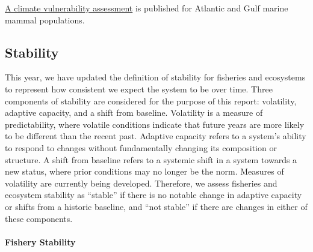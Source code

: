 \documentclass[
  10pt,
]{article}
\begin{document}
\href{https://journals.plos.org/plosone/article?id=10.1371/journal.pone.0290643}{A climate vulnerability assessment} is published for Atlantic and Gulf marine mammal populations.

\newpage

\subsection{Stability}\label{stability}

This year, we have updated the definition of stability for fisheries and ecosystems to represent how consistent we expect the system to be over time. Three components of stability are considered for the purpose of this report: volatility, adaptive capacity, and a shift from baseline. Volatility is a measure of predictability, where volatile conditions indicate that future years are more likely to be different than the recent past. Adaptive capacity refers to a system's ability to respond to changes without fundamentally changing its composition or structure. A shift from baseline refers to a systemic shift in a system towards a new status, where prior conditions may no longer be the norm. Measures of volatility are currently being developed. Therefore, we assess fisheries and ecosystem stability as ``stable'' if there is no notable change in adaptive capacity or shifts from a historic baseline, and ``not stable'' if there are changes in either of these components.

\paragraph{Fishery Stability}\label{fishery-stability}
\end{document}
